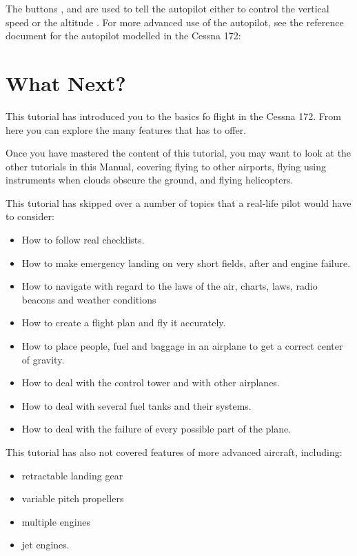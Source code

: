 The buttons ,  and  are used to tell
the autopilot either to control the vertical
speed
\textcolor{orange}{} or the altitude
\textcolor{orange}{}.
For more advanced use of the autopilot, see the reference document for the
autopilot modelled in the Cessna 172:
\section{What Next?}
\label{sec:Poslowie}

This tutorial has introduced you to the basics fo flight in the Cessna 172. From
here you can explore the many features that \FlightGear{} has to offer.

Once you have mastered the content of this tutorial, you may want to look at the
other tutorials in this Manual, covering flying to other airports, flying using
instruments when clouds obscure the ground, and flying helicopters.

This tutorial has skipped over a number of topics that a real-life pilot would
have to consider:
\begin{itemize}
    \item How to follow real checklists.
    \item How to make emergency landing on very short fields, after and engine
  failure.
    \item How to navigate with regard to the laws of the air, charts, laws, radio
  beacons and weather conditions
    \item How to create a flight plan and fly it accurately.
    \item How to place people, fuel and baggage in an airplane to get a correct
  center of gravity.
    \item How to deal with the control tower and with other airplanes.
    \item How to deal with several fuel tanks and their systems.
    \item How to deal with the failure of every possible part of the plane.
\end{itemize}

This tutorial has also not covered features of more advanced aircraft,
including:
\begin{itemize}
  \item retractable landing gear
  \item variable pitch propellers
  \item multiple engines
  \item jet engines.
\end{itemize}

